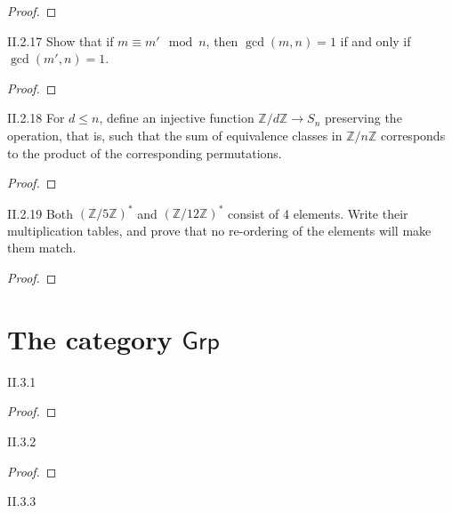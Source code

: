 \begin{proof}
\end{proof}

\begin{exercise}{II.2.17}
    Show that if $m\equiv m' \mod{n}$, then $\gcd(m, n) = 1$ if and only if $\gcd(m', n) = 1$.
\end{exercise}

\begin{proof}
\end{proof}

\begin{exercise}{II.2.18}
    For $d\leq n$, define an injective function $\mathbb{Z}/d\mathbb{Z}\to S_{n}$ preserving the operation, that is, such that the sum of equivalence classes in $\mathbb{Z}/n\mathbb{Z}$ corresponds to the product of the corresponding permutations.
\end{exercise}

\begin{proof}
\end{proof}

\begin{exercise}{II.2.19}
    Both ${(\mathbb{Z}/5\mathbb{Z})}^{*}$ and ${(\mathbb{Z}/12\mathbb{Z})}^{*}$ consist of 4 elements. Write their multiplication tables, and prove that no re-ordering of the elements will make them match.
\end{exercise}

\begin{proof}
\end{proof}

\section{The category $\mathsf{Grp}$}

\begin{exercise}{II.3.1}
\end{exercise}

\begin{proof}
\end{proof}

\begin{exercise}{II.3.2}
\end{exercise}

\begin{proof}
\end{proof}

\begin{exercise}{II.3.3}
\end{exercise}

